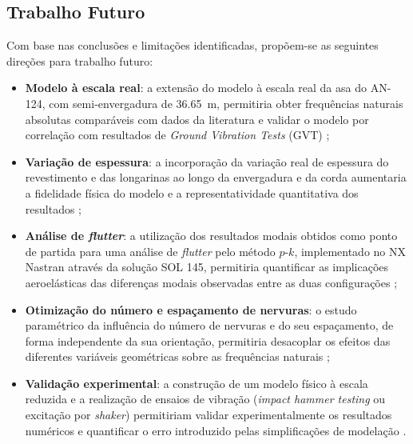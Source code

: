 \documentclass[a4paper,fleqn]{cas-sc}
\begin{document}
\subsection{Trabalho Futuro}

Com base nas conclusões e limitações identificadas, propõem-se as seguintes direções para trabalho futuro:

\begin{itemize}
    \item \textbf{Modelo à escala real}: a extensão do modelo à escala real da asa do AN-124, com semi-envergadura de \SI{36.65}{\meter}, permitiria obter frequências naturais absolutas comparáveis com dados da literatura e validar o modelo por correlação com resultados de \textit{Ground Vibration Tests} (GVT) \cite{Ewins2000};

    \item \textbf{Variação de espessura}: a incorporação da variação real de espessura do revestimento e das longarinas ao longo da envergadura e da corda aumentaria a fidelidade física do modelo e a representatividade quantitativa dos resultados \cite{Niu1988};

    \item \textbf{Análise de \textit{flutter}}: a utilização dos resultados modais obtidos como ponto de partida para uma análise de \textit{flutter} pelo método $p$-$k$, implementado no NX Nastran através da solução SOL 145, permitiria quantificar as implicações aeroelásticas das diferenças modais observadas entre as duas configurações \cite{Nastran2014, Wright2015};

    \item \textbf{Otimização do número e espaçamento de nervuras}: o estudo paramétrico da influência do número de nervuras e do seu espaçamento, de forma independente da sua orientação, permitiria desacoplar os efeitos das diferentes variáveis geométricas sobre as frequências naturais \cite{Dowell2004};

    \item \textbf{Validação experimental}: a construção de um modelo físico à escala reduzida e a realização de ensaios de vibração (\textit{impact hammer testing} ou excitação por \textit{shaker}) permitiriam validar experimentalmente os resultados numéricos e quantificar o erro introduzido pelas simplificações de modelação \cite{Ewins2000, Maia1997}.
\end{itemize}

\printcredits

%





\end{document}

